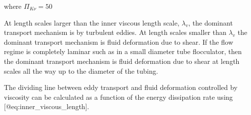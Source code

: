 \documentclass[letterpaper,10pt,english]{sphinxmanual}
\begin{document}
where \(\Pi_{K\nu} = 50\)

At length scales larger than the inner viscous length scale, \(\lambda_v\), the dominant transport mechanism is by turbulent eddies. At length scales smaller than \(\lambda_v\) the dominant transport mechanism is fluid deformation due to shear. If the flow regime is completely laminar such as in a small diameter tube flocculator, then the dominant transport mechanism is fluid deformation due to shear at length scales all the way up to the diameter of the tubing.

The dividing line between eddy transport and fluid deformation controlled by viscosity can be calculated as a function of the energy dissipation rate using {[}@eq:inner\_viscous\_length{]}.

%
\begin{sphinxVerbatim}[commandchars=\\\{\}]
  
  
   
   
   
  
  
  
  
        


\end{sphinxVerbatim}
\end{document}
